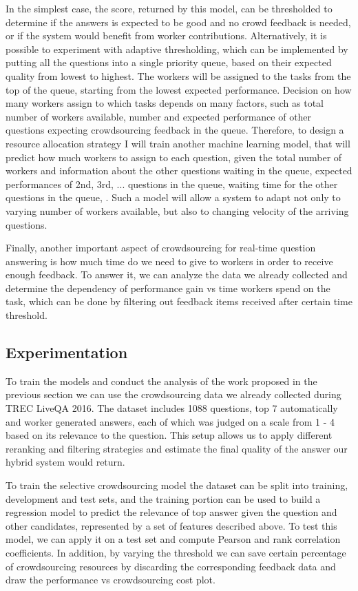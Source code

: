 In the simplest case, the score, returned by this model, can be thresholded to determine if the answers is expected to be good and no crowd feedback is needed, or if the system would benefit from worker contributions.
Alternatively, it is possible to experiment with adaptive thresholding, which can be implemented by putting all the questions into a single priority queue, based on their expected quality from lowest to highest.
The workers will be assigned to the tasks from the top of the queue, \ie starting from the lowest expected performance.
Decision on how many workers assign to which tasks depends on many factors, such as total number of workers available, number and expected performance of other questions expecting crowdsourcing feedback in the queue.
Therefore, to design a resource allocation strategy I will train another machine learning model, that will predict how much workers to assign to each question, given the total number of workers and information about the other questions waiting in the queue, \ie expected performances of 2nd, 3rd, ... questions in the queue, waiting time for the other questions in the queue, \etc.
Such a model will allow a system to adapt not only to varying number of workers available, but also to changing velocity of the arriving questions.

Finally, another important aspect of crowdsourcing for real-time question answering is how much time do we need to give to workers in order to receive enough feedback.
To answer it, we can analyze the data we already collected and determine the dependency of performance gain vs time workers spend on the task, which can be done by filtering out feedback items received after certain time threshold.

\subsection{Experimentation}
\label{section:crowdsourcing:experiments}

To train the models and conduct the analysis of the work proposed in the previous section we can use the crowdsourcing data we already collected during TREC LiveQA 2016.
The dataset includes 1088 questions, top 7 automatically and worker generated answers, each of which was judged on a scale from 1 - 4 based on its relevance to the question.
This setup allows us to apply different reranking and filtering strategies and estimate the final quality of the answer our hybrid system would return.

To train the selective crowdsourcing model the dataset can be split into training, development and test sets, and the training portion can be used to build a regression model to predict the relevance of top answer given the question and other candidates, represented by a set of features described above.
To test this model, we can apply it on a test set and compute Pearson and rank correlation coefficients.
In addition, by varying the threshold we can save certain percentage of crowdsourcing resources by discarding the corresponding feedback data and draw the performance vs crowdsourcing cost plot.

